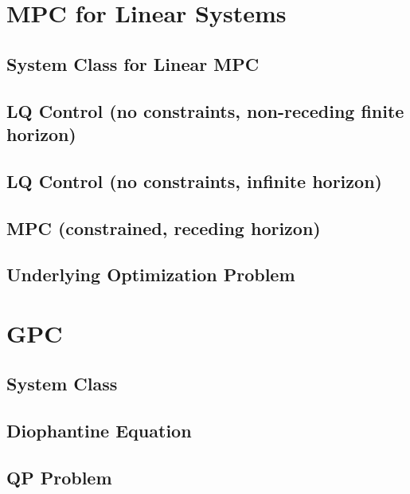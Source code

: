 \documentclass[english]{latex4ei/latex4ei_sheet}
\begin{document}
\section{MPC for Linear Systems}
\begin{sectionbox}

\subsection{System Class for Linear MPC}

\subsection{LQ Control (no constraints, non-receding finite horizon)}

\subsection{LQ Control (no constraints, infinite horizon)}

\subsection{MPC (constrained, receding horizon)}

\subsection{Underlying Optimization Problem}

\end{sectionbox}

\newpage
\section{GPC}
\begin{sectionbox}

\subsection{System Class}

\subsection{Diophantine Equation}

\subsection{QP Problem}

\end{sectionbox}
\end{document}
